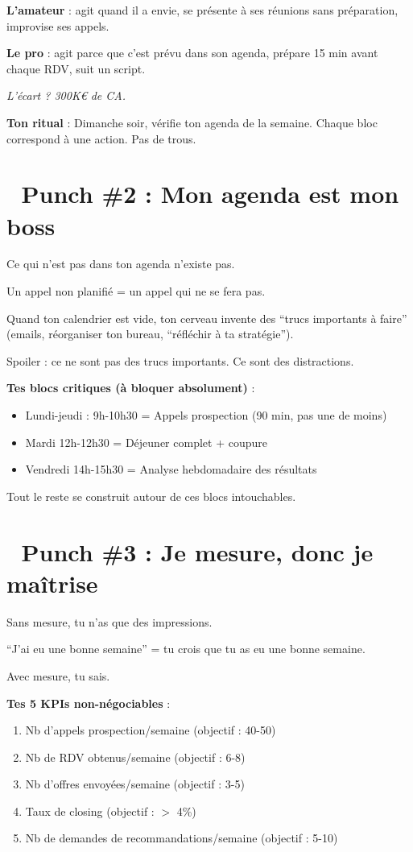 \documentclass[12pt,a4paper,openany]{book}
\begin{document}
\textbf{L'amateur} : agit quand il a envie, se présente à ses réunions sans préparation, improvise ses appels.

\textbf{Le pro} : agit parce que c'est prévu dans son agenda, prépare 15 min avant chaque RDV, suit un script.

\textit{L'écart ? 300K\euro{} de CA.}

\textbf{Ton ritual} : Dimanche soir, vérifie ton agenda de la semaine. Chaque bloc correspond à une action. Pas de trous.

\section*{🥊 Punch \#2 : Mon agenda est mon boss}

Ce qui n'est pas dans ton agenda n'existe pas.

Un appel non planifié = un appel qui ne se fera pas.

Quand ton calendrier est vide, ton cerveau invente des ``trucs importants à faire'' (emails, réorganiser ton bureau, ``réfléchir à ta stratégie'').

Spoiler : ce ne sont pas des trucs importants. Ce sont des distractions.

\textbf{Tes blocs critiques (à bloquer absolument)} :
\begin{itemize}
\item Lundi-jeudi : 9h-10h30 = Appels prospection (90 min, pas une de moins)
\item Mardi 12h-12h30 = Déjeuner complet + coupure
\item Vendredi 14h-15h30 = Analyse hebdomadaire des résultats
\end{itemize}

Tout le reste se construit autour de ces blocs intouchables.

\section*{🥊 Punch \#3 : Je mesure, donc je maîtrise}

Sans mesure, tu n'as que des impressions.

``J'ai eu une bonne semaine'' = tu crois que tu as eu une bonne semaine.

Avec mesure, tu sais.

\textbf{Tes 5 KPIs non-négociables} :
\begin{enumerate}
\item Nb d'appels prospection/semaine (objectif : 40-50)
\item Nb de RDV obtenus/semaine (objectif : 6-8)
\item Nb d'offres envoyées/semaine (objectif : 3-5)
\item Taux de closing (objectif : $>$ 4\%)
\item Nb de demandes de recommandations/semaine (objectif : 5-10)
\end{enumerate}
\end{document}
